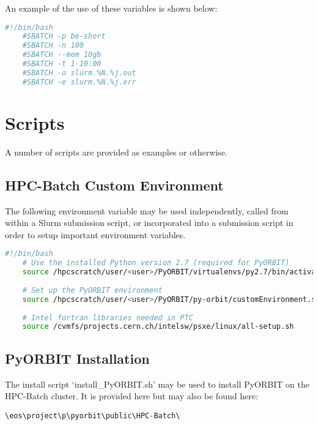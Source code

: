 \documentclass[a4paper]{cernatsnote}
\def \pyorbiteos {\texttt{\textbackslash eos\textbackslash project\textbackslash p\textbackslash pyorbit\textbackslash public\textbackslash HPC-Batch\textbackslash}}
\begin{document}
An example of the use of these variables is shown below:
	
	\begin{lstlisting}[language=bash]
	#!/bin/bash
	#SBATCH -p be-short
	#SBATCH -n 100
	#SBATCH --mem 10gb
	#SBATCH -t 1-10:00
	#SBATCH -o slurm.%N.%j.out
	#SBATCH -e slurm.%N.%j.err
	\end{lstlisting}
	
	\section{Scripts}
	\label{sec:scripts}
	
	A number of scripts are provided as examples or otherwise.
	
	\subsection{HPC-Batch Custom Environment}
	\label{sec:environment_script}
	
	The following environment variable may be used independently, called from within a Slurm submission script, or incorporated into a submission script in order to setup important environment variables.
	
	\begin{lstlisting}[language=bash]
	#!/bin/bash
	# Use the installed Python version 2.7 (required for PyORBIT)
	source /hpcscratch/user/<user>/PyORBIT/virtualenvs/py2.7/bin/activate
	
	# Set up the PyORBIT environment
	source /hpcscratch/user/<user>/PyORBIT/py-orbit/customEnvironment.sh
	
	# Intel fortran libraries needed in PTC
	source /cvmfs/projects.cern.ch/intelsw/psxe/linux/all-setup.sh
	\end{lstlisting}
	
	\subsection{PyORBIT Installation}
	\label{sec:install_script}
	
	The install script `install\_PyORBIT.sh' may be used to install PyORBIT on the HPC-Batch cluster. It is provided here but may also be found here:
	
	\pyorbiteos
	
\end{document}
